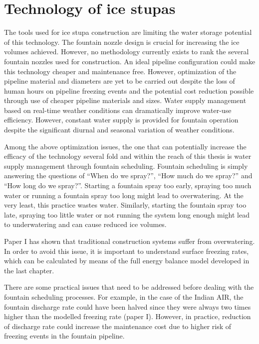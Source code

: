 \chapter{Technology of ice stupas}
\label{chap:tech}


The tools used for ice stupa construction are limiting the water storage potential of this technology. The
fountain nozzle design is crucial for increasing the ice volumes achieved. However, no methodology currently
exists to rank the several fountain nozzles used for construction. An ideal pipeline configuration could make
this technology cheaper and maintenance free. However, optimization of the pipeline material and diameters are
yet to be carried out despite the loss of human hours on pipeline freezing events and the potential cost
reduction possible through use of cheaper pipeline materials and sizes. Water supply management based on
real-time weather conditions can dramatically improve water-use efficiency. However, constant water supply is
provided for fountain operation despite the significant diurnal and seasonal variation of weather conditions.

Among the above optimization issues, the one that can potentially increase the efficacy of the technology
several fold and within the reach of this thesis is water supply management through fountain scheduling.
Fountain scheduling is simply answering the questions of “When do we spray?”, “How much do we spray?” and “How
long do we spray?”. Starting a fountain spray too early, spraying too much water or running a fountain spray too
long might lead to overwatering. At the very least, this practice wastes water.  Similarly, starting the
fountain spray too late, spraying too little water or not running the system long enough might lead to
underwatering and can cause reduced ice volumes.

Paper I has shown that traditional construction systems suffer from overwatering. In order to avoid this issue,
it is important to understand surface freezing rates, which can be calculated by means of the full energy
balance model developed in the last chapter.

There are some practical issues that need to be addressed before dealing with the fountain scheduling processes.
For example, in the case of the Indian AIR, the fountain discharge rate could have been halved since they were
always two times higher than the modelled freezing rate (paper I). However, in practice, reduction of discharge
rate could increase the maintenance cost due to higher risk of freezing events in the fountain pipeline.

